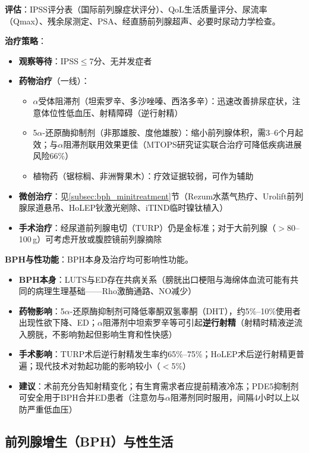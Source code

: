 \documentclass[12pt,a4paper,twoside]{ctexbook}
\begin{document}
\textbf{评估}：IPSS评分表（国际前列腺症状评分）、QoL生活质量评分、尿流率（Qmax）、残余尿测定、PSA、经直肠前列腺超声、必要时尿动力学检查。

\textbf{治疗策略}：
\begin{itemize}[leftmargin=2cm]
	\item \textbf{观察等待}：IPSS$\le$7分、无并发症者
	\item \textbf{药物治疗}（一线）：
    \begin{itemize}
    	\item $\alpha$受体阻滞剂（坦索罗辛、多沙唑嗪、西洛多辛）：迅速改善排尿症状，注意体位性低血压、射精障碍（逆行射精）
    	\item 5$\alpha$-还原酶抑制剂（非那雄胺、度他雄胺）：缩小前列腺体积，需3--6个月起效；与$\alpha$阻滞剂联用效果更佳（MTOPS研究证实联合治疗可降低疾病进展风险66\%）
    	\item 植物药（锯棕榈、非洲臀果木）：疗效证据较弱，可作为辅助
    \end{itemize}
	\item \textbf{微创治疗}：见\ref{subsec:bph_minitreatment}节（Rezum水蒸气热疗、Urolift前列腺尿道悬吊、HoLEP钬激光剜除、iTIND临时镍钛植入）
	\item \textbf{手术治疗}：经尿道前列腺电切（TURP）仍是金标准；对于大前列腺（$>$80--100\,g）可考虑开放或腹腔镜前列腺摘除
\end{itemize}

\textbf{BPH与性功能}：BPH本身及治疗均可影响性功能。
\begin{itemize}[leftmargin=2cm]
	\item \textbf{BPH本身}：LUTS与ED存在共病关系（膀胱出口梗阻与海绵体血流可能有共同的病理生理基础——Rho激酶通路、NO减少）
	\item \textbf{药物影响}：5$\alpha$-还原酶抑制剂可降低睾酮双氢睾酮（DHT），约5\%--10\%使用者出现性欲下降、ED；$\alpha$阻滞剂中坦索罗辛等可引起\textbf{逆行射精}（射精时精液逆流入膀胱，不影响勃起但影响生育和性快感）
	\item \textbf{手术影响}：TURP术后逆行射精发生率约65\%--75\%；HoLEP术后逆行射精更普遍；现代技术对勃起功能的影响较小（$<$5\%）
	\item \textbf{建议}：术前充分告知射精变化；有生育需求者应提前精液冷冻；PDE5抑制剂可安全用于BPH合并ED患者（注意勿与$\alpha$阻滞剂同时服用，间隔4小时以上以防严重低血压）
\end{itemize}

\subsection{前列腺增生（BPH）与性生活}
\end{document}

